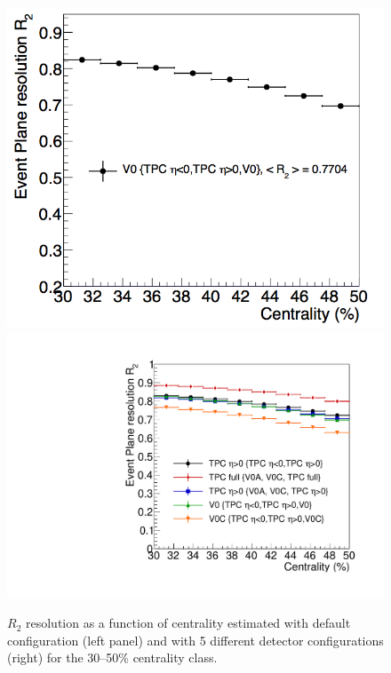 \begin{figure}
\centering
  \includegraphics[width=.49\textwidth]{FigCap5/resoEP3050.png}
  \includegraphics[width=.49\textwidth]{FigCap5/EPresolution_comparison.pdf}
\caption{$R_2$ resolution as a function of centrality estimated with default configuration (left panel) and with 5 different detector configurations (right) for the 30--50\% centrality class.}
\label{fig:resoVsDetConfig}
\end{figure}

